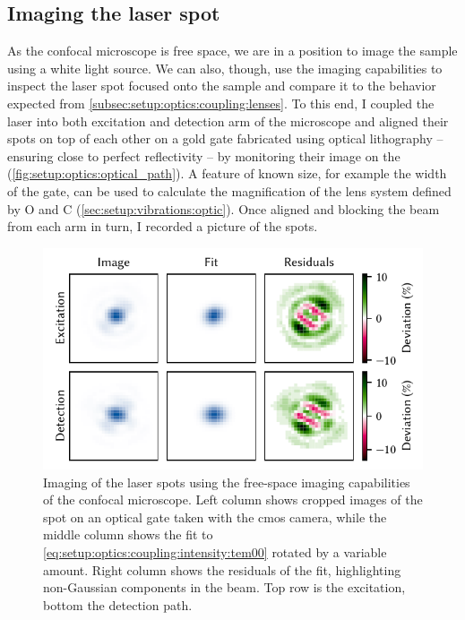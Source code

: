 \subsection{Imaging the laser spot}\label{subsec:setup:optics:coupling:imaging}
As the confocal microscope is free space, we are in a position to image the sample using a white light source.
We can also, though, use the imaging capabilities to inspect the laser spot focused onto the sample and compare it to the behavior expected from \cref{subsec:setup:optics:coupling:lenses}.
To this end, I coupled the laser into both excitation and detection arm of the microscope and aligned their spots on top of each other on a gold gate fabricated using optical lithography -- ensuring close to perfect reflectivity -- by monitoring their image on the \cmoscam (\cf \cref{fig:setup:optics:optical_path}).
A feature of known size, for example the width of the gate, can be used to calculate the magnification of the lens system defined by O and C (\cf \cref{sec:setup:vibrations:optic}).
Once aligned and blocking the beam from each arm in turn, I recorded a picture of the spots.

\begin{figure}
    \centering
    \includegraphics{img/pdf/setup/spots}
    \caption[]{
        Imaging of the laser spots using the free-space imaging capabilities of the confocal microscope.
        Left column shows cropped images of the spot on an optical gate taken with the \gls{cmos} camera, while the middle column shows the fit to \cref{eq:setup:optics:coupling:intensity:tem00} rotated by a variable amount.
        Right column shows the residuals of the fit, highlighting non-Gaussian components in the beam.
        Top row is the excitation, bottom the detection path.
    }
    \label{fig:setup:optics:coupling:imaging}
\end{figure}

